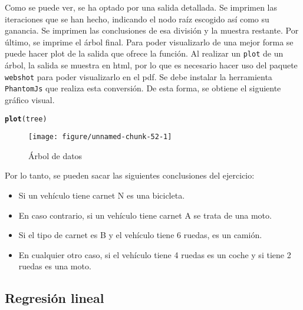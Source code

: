 \documentclass[12pt]{report}\usepackage[]{graphicx}\usepackage[dvipsnames]{xcolor}
\makeatletter
\def\maxwidth{ %
  \ifdim\Gin@nat@width>\linewidth
    \linewidth
  \else
    \Gin@nat@width
  \fi
}
\newcommand{\hlstd}[1]{\textcolor[rgb]{0.345,0.345,0.345}{#1}}%
\newcommand{\hlkwd}[1]{\textcolor[rgb]{0.737,0.353,0.396}{\textbf{#1}}}%
\newenvironment{kframe}{%
 \def\at@end@of@kframe{}%
 \ifinner\ifhmode%
  \def\at@end@of@kframe{\end{minipage}}%
  \begin{minipage}{\columnwidth}%
 \fi\fi%
 \def\FrameCommand##1{\hskip\@totalleftmargin \hskip-\fboxsep
 \colorbox{shadecolor}{##1}\hskip-\fboxsep
     \hskip-\linewidth \hskip-\@totalleftmargin \hskip\columnwidth}%
 \MakeFramed {\advance\hsize-\width
   \@totalleftmargin\z@ \linewidth\hsize
   \@setminipage}}%
 {\par\unskip\endMakeFramed%
 \at@end@of@kframe}
\newenvironment{knitrout}{}{} %
\makeatother
\begin{document}
 			Como se puede ver, se ha optado por una salida detallada. Se imprimen las iteraciones que se han hecho, indicando el nodo raíz escogido así como su ganancia. Se imprimen las conclusiones de esa división y la muestra restante. Por último, se imprime el árbol final. Para poder visualizarlo de una mejor forma se puede hacer plot de la salida que ofrece la función. Al realizar un \texttt{plot} de un árbol, la salida se muestra en html, por lo que es necesario hacer uso del paquete \texttt{webshot} para poder visualizarlo en el pdf. Se debe instalar la herramienta \texttt{PhantomJs} que realiza esta conversión. De esta forma, se obtiene el siguiente gráfico visual.
 			
\begin{knitrout}
\color{fgcolor}\begin{kframe}
\begin{alltt}
\hlkwd{plot}\hlstd{(tree)}
\end{alltt}
\end{kframe}\begin{figure}

{\centering \texttt{[image: figure/unnamed-chunk-52-1]} 

}

\caption[Árbol de datos]{Árbol de datos}\label{fig:unnamed-chunk-52}
\end{figure}

\end{knitrout}
 			
 			Por lo tanto, se pueden sacar las siguientes conclusiones del ejercicio:
 			
 			\begin{itemize}
 				\item Si un vehículo tiene carnet N es una bicicleta.
 				\item En caso contrario, si un vehículo tiene carnet A se trata de una moto.
 				\item Si el tipo de carnet es B y el vehículo tiene 6 ruedas, es un camión.
 				\item En cualquier otro caso, si el vehículo tiene 4 ruedas es un coche y si tiene 2 ruedas es una moto.
 			\end{itemize}				
 			
 			\subsection{Regresión lineal}
 			
\end{document}
